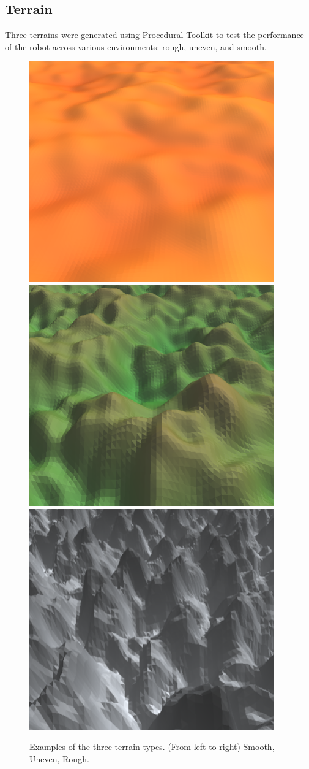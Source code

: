 \documentclass{article}
\begin{document}
\subsection{Terrain}
Three terrains were generated using Procedural Toolkit  to test the performance of the robot across various environments: rough, uneven, and smooth. 
\begin{figure}[H]
\centering
\includegraphics[scale=0.3]{smoothTerrain}
\includegraphics[scale=0.3]{unevenTerrain}
\includegraphics[scale=0.3]{roughTerrain}
\caption{Examples of the three terrain types. (From left to right) Smooth, Uneven, Rough.}
\end{figure}
\end{document}
